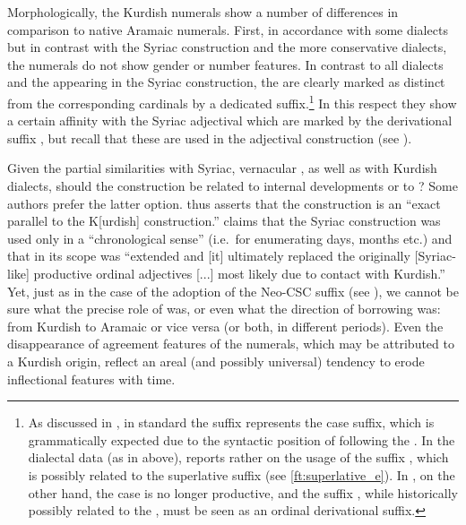 Morphologically, the Kurdish numerals show a number of differences in comparison to native Aramaic numerals. First, in accordance with some  dialects but in contrast with the Syriac construction and the more conservative  dialects, the numerals do not show gender or number features. In contrast to all  dialects and the  appearing in the Syriac \lnk* construction, the  are clearly marked as distinct from the corresponding cardinals by a dedicated suffix.\footnote{As discussed in , in standard \Kur the suffix  represents the \pl* \obl* case suffix, which is grammatically expected due to the syntactic position of  following the \ez*. In the dialectal data (as in \Ak above), \citet[170]{MacKenzie} reports rather on the usage of the suffix , which is possibly related to the superlative suffix (see \vref{ft:superlative_e}). In \Sor, on the other hand, the \obl* case is no longer productive, and the suffix , while historically possibly related to the \pl* \obl* {}, must be seen as an ordinal derivational suffix. }  In this respect they show a certain affinity with the Syriac adjectival  which are marked by the  derivational suffix , but recall that these  are used in the adjectival  construction (see ).

Given the partial similarities with Syriac, vernacular , as well as with Kurdish dialects, should the  construction be related to internal developments or to ? Some authors prefer the latter option. \citet[172]{Garbell1965impact} thus asserts that the  construction is an \enquote{exact parallel to the K[urdish] construction.}  \citet[214]{Noorlander} claims that the Syriac \lnk* construction was used only in a \enquote{chronological sense} (i.e.\ for enumerating days, months etc.) and that in  its scope was \enquote{extended and [it] ultimately replaced the originally [Syriac-like] productive ordinal adjectives [...] most likely due to contact with Kurdish.} Yet,  just as in the case of the adoption of the Neo-CSC suffix \ed (see ), we cannot be sure what  the precise role of  was, or even what the direction of borrowing was: from Kurdish to Aramaic or vice versa (or both, in different periods). Even the disappearance of agreement features of the numerals, which may be attributed to a Kurdish origin, reflect an areal (and possibly universal) tendency to erode inflectional features with time. 

